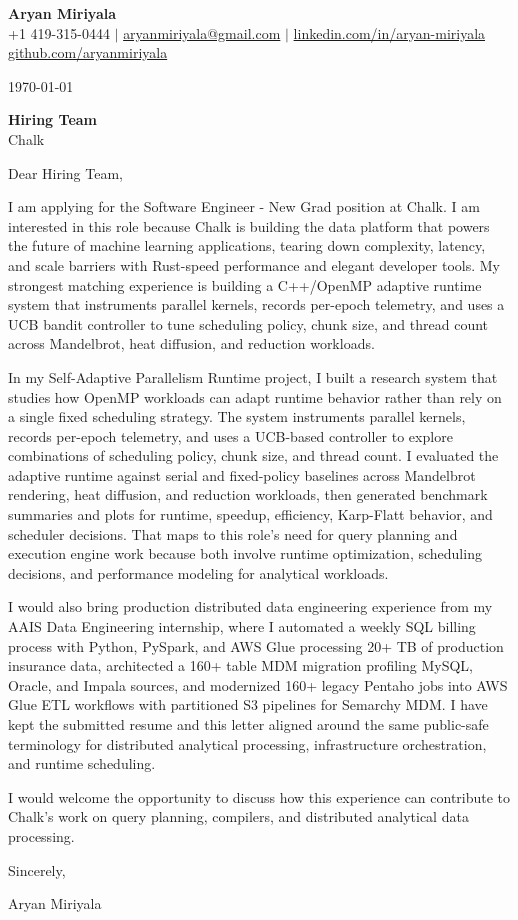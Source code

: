 \documentclass[letterpaper,11pt]{article}
\begin{document}
\begin{center}
  {\LARGE \textbf{Aryan Miriyala}}\\[2pt]
  \small
  +1 419-315-0444 $|$ \href{mailto:aryanmiriyala@gmail.com}{aryanmiriyala@gmail.com} $|$ \href{https://www.linkedin.com/in/aryan-miriyala-7788a21b6/}{linkedin.com/in/aryan-miriyala}\\
  \href{https://github.com/aryanmiriyala}{github.com/aryanmiriyala}
\end{center}\vspace{12pt}

\today

\vspace{12pt}

\textbf{Hiring Team}\\
Chalk

\vspace{12pt}

Dear Hiring Team,

I am applying for the Software Engineer - New Grad position at Chalk. I am interested in this role because Chalk is building the data platform that powers the future of machine learning applications, tearing down complexity, latency, and scale barriers with Rust-speed performance and elegant developer tools. My strongest matching experience is building a C++/OpenMP adaptive runtime system that instruments parallel kernels, records per-epoch telemetry, and uses a UCB bandit controller to tune scheduling policy, chunk size, and thread count across Mandelbrot, heat diffusion, and reduction workloads.

In my Self-Adaptive Parallelism Runtime project, I built a research system that studies how OpenMP workloads can adapt runtime behavior rather than rely on a single fixed scheduling strategy. The system instruments parallel kernels, records per-epoch telemetry, and uses a UCB-based controller to explore combinations of scheduling policy, chunk size, and thread count. I evaluated the adaptive runtime against serial and fixed-policy baselines across Mandelbrot rendering, heat diffusion, and reduction workloads, then generated benchmark summaries and plots for runtime, speedup, efficiency, Karp-Flatt behavior, and scheduler decisions. That maps to this role's need for query planning and execution engine work because both involve runtime optimization, scheduling decisions, and performance modeling for analytical workloads.

I would also bring production distributed data engineering experience from my AAIS Data Engineering internship, where I automated a weekly SQL billing process with Python, PySpark, and AWS Glue processing 20+ TB of production insurance data, architected a 160+ table MDM migration profiling MySQL, Oracle, and Impala sources, and modernized 160+ legacy Pentaho jobs into AWS Glue ETL workflows with partitioned S3 pipelines for Semarchy MDM. I have kept the submitted resume and this letter aligned around the same public-safe terminology for distributed analytical processing, infrastructure orchestration, and runtime scheduling.

I would welcome the opportunity to discuss how this experience can contribute to Chalk's work on query planning, compilers, and distributed analytical data processing.

\vspace{12pt}

Sincerely,

Aryan Miriyala
\end{document}
